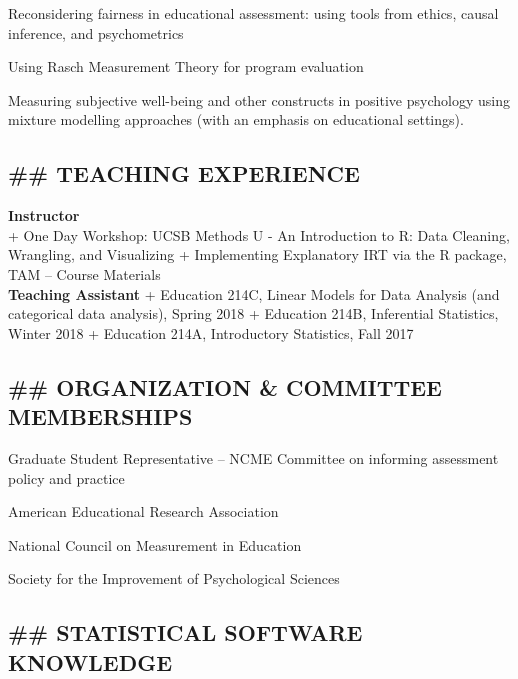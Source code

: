 \documentclass[]{article}
\providecommand{\tightlist}{%
  \setlength{\itemsep}{0pt}\setlength{\parskip}{0pt}}
\renewenvironment{itemize}{
  \begin{list}{}{
    \setlength{\leftmargin}{1.5em}
  }
}{
  \end{list}
}
\begin{document}
Reconsidering fairness in educational assessment: using tools from
ethics, causal inference, and psychometrics

Using Rasch Measurement Theory for program evaluation

Measuring subjective well-being and other constructs in positive
psychology using mixture modelling approaches (with an emphasis on
educational settings).

\hypertarget{teaching-experience}{%
\subsection{\#\# TEACHING EXPERIENCE}\label{teaching-experience}}

\textbf{Instructor}\\
+ One Day Workshop: UCSB Methods U - An Introduction to R: Data
Cleaning, Wrangling, and Visualizing + Implementing Explanatory IRT via
the R package, TAM -- Course Materials\\

\textbf{Teaching Assistant} + Education 214C, Linear Models for Data
Analysis (and categorical data analysis), Spring 2018 + Education 214B,
Inferential Statistics, Winter 2018 + Education 214A, Introductory
Statistics, Fall 2017

\hypertarget{organization-committee-memberships}{%
\subsection{\#\# ORGANIZATION \& COMMITTEE
MEMBERSHIPS}\label{organization-committee-memberships}}

\begin{itemize}
\tightlist
\item
  Graduate Student Representative -- NCME Committee on informing
  assessment policy and practice
\item
  American Educational Research Association
\item
  National Council on Measurement in Education
\item
  Society for the Improvement of Psychological Sciences
\end{itemize}

\hypertarget{statistical-software-knowledge}{%
\subsection{\#\# STATISTICAL SOFTWARE
KNOWLEDGE}\label{statistical-software-knowledge}}
\end{document}
